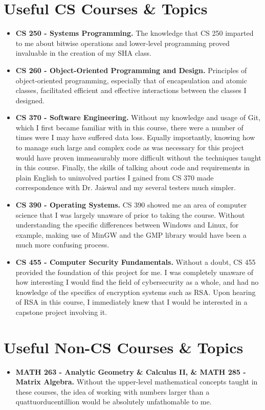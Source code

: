 \documentclass[11pt]{article}
\begin{document}
\section{Useful CS Courses \& Topics}
\begin{itemize}
\item{\textbf{CS 250 - Systems Programming.} The knowledge that CS 250 imparted to me about bitwise operations and lower-level programming proved invaluable in the creation of my SHA class.}
\item{\textbf{CS 260 - Object-Oriented Programming and Design.} Principles of object-oriented programming, especially that of encapsulation and atomic classes, facilitated efficient and effective interactions between the classes I designed.}
\item{\textbf{CS 370 - Software Engineering.} Without my knowledge and usage of Git, which I first became familiar with in this course, there were a number of times were I may have suffered data loss. Equally importantly, knowing how to manage such large and complex code as was necessary for this project would have proven immeasurably more difficult without the techniques taught in this course. Finally, the skills of talking about code and requirements in plain English to uninvolved parties I gained from CS 370 made correspondence with Dr. Jaiswal and my several testers much simpler.}
\item{\textbf{CS 390 - Operating Systems.} CS 390 showed me an area of computer science that I was largely unaware of prior to taking the course. Without understanding the specific differences between Windows and Linux, for example, making use of MinGW and the GMP library would have been a much more confusing process.}
\item{\textbf{CS 455 - Computer Security Fundamentals.} Without a doubt, CS 455 provided the foundation of this project for me. I was completely unaware of how interesting I would find the field of cybersecurity as a whole, and had no knowledge of the specifics of encryption systems such as RSA. Upon hearing of RSA in this course, I immediately knew that I would be interested in a capstone project involving it.}
\end{itemize}

\section{Useful Non-CS Courses \& Topics}
\begin{itemize}
\item{\textbf{MATH 263 - Analytic Geometry \& Calculus II, \& MATH 285 - Matrix Algebra.} Without the upper-level mathematical concepts taught in these courses, the idea of working with numbers larger than a quattuorducentillion would be absolutely unfathomable to me.}
\end{itemize}
\end{document}
